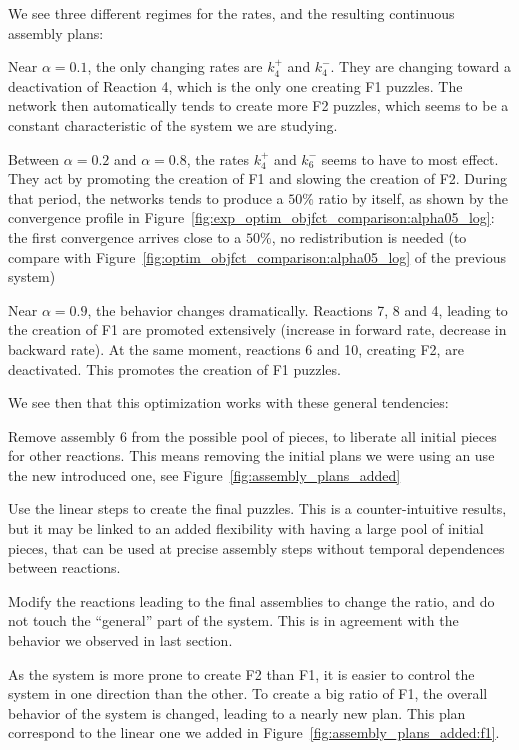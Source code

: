         We see three different regimes for the rates, and the resulting continuous assembly plans:
        \begin{my_enumerate}
            \item Near $\alpha=0.1$, the only changing rates are $k_4^+$ and $k_4^-$. They are changing toward a deactivation of Reaction 4, which is the only one creating F1 puzzles. The network then automatically tends to create more F2 puzzles, which seems to be a constant characteristic of the system we are studying.
            \item Between $\alpha=0.2$ and $\alpha = 0.8$, the rates $k_4^+$ and $k_6^-$ seems to have to most effect. They act by promoting the creation of F1 and slowing the creation of F2. During that period, the networks tends to produce a $50\%$ ratio by itself, as shown by the convergence profile in Figure~\ref{fig:exp_optim_objfct_comparison:alpha05_log}: the first convergence arrives close to a $50\%$, no redistribution is needed (to compare with Figure~\ref{fig:optim_objfct_comparison:alpha05_log} of the previous system)
            \item Near $\alpha = 0.9$, the behavior changes dramatically. Reactions 7, 8 and 4, leading to the creation of F1 are promoted extensively (increase in forward rate, decrease in backward rate). At the same moment, reactions 6 and 10, creating F2, are deactivated. This promotes the creation of F1 puzzles.
        \end{my_enumerate}

        We see then that this optimization works with these general tendencies:

        \begin{my_itemize}
            \item Remove assembly 6 from the possible pool of pieces, to liberate all initial pieces for other reactions. This means removing the initial plans we were using an use the new introduced one, see Figure~\ref{fig:assembly_plans_added}
            \item Use the linear steps to create the final puzzles. This is a counter-intuitive results, but it may be linked to an added flexibility with having a large pool of initial pieces, that can be used at precise assembly steps without temporal dependences between reactions.
            \item Modify the reactions leading to the final assemblies to change the ratio, and do not touch the ``general'' part of the system. This is in agreement with the behavior we observed in last section.
            \item As the system is more prone to create F2 than F1, it is easier to control the system in one direction than the other. To create a big ratio of F1, the overall behavior of the system is changed, leading to a nearly new plan. This plan correspond to the linear one we added in Figure~\ref{fig:assembly_plans_added:f1}.
        \end{my_itemize}

